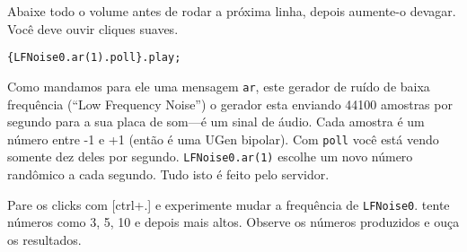 Abaixe todo o volume antes de rodar a próxima linha, depois aumente-o devagar. Você deve ouvir cliques suaves.

\begin{lstlisting}[style=SuperCollider-IDE, basicstyle=\scttfamily\footnotesize]
{LFNoise0.ar(1).poll}.play;
\end{lstlisting}

Como mandamos para ele uma mensagem \texttt{ar}, este gerador de ruído de baixa frequência (“Low Frequency Noise”) o gerador esta enviando 44100 amostras por segundo para a sua placa de som---é um sinal de áudio. Cada amostra é um número entre -1 e +1 (então é uma UGen bipolar). Com \texttt{poll} você está vendo somente dez deles por segundo. \texttt{LFNoise0.ar(1)} escolhe um novo número randômico a cada segundo. Tudo isto é feito pelo servidor.

Pare os clicks com [ctrl+.] e experimente mudar a frequência de \texttt{LFNoise0}. tente números como 3, 5, 10 e depois mais altos. Observe os números produzidos e ouça os resultados.
